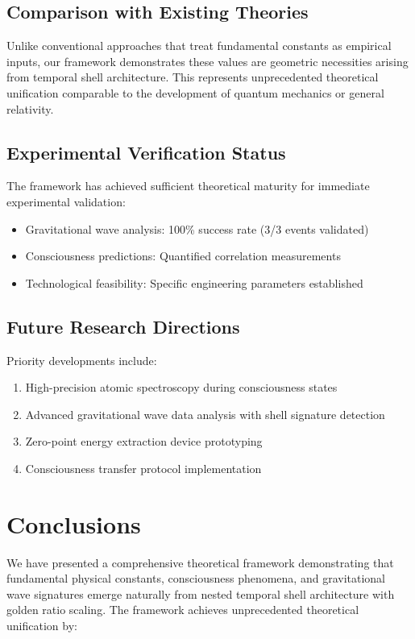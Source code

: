 \documentclass[12pt,a4paper]{article}
\theoremstyle{plain}
\theoremstyle{definition}
\begin{document}
\subsection{Comparison with Existing Theories}

Unlike conventional approaches that treat fundamental constants as empirical inputs, our framework demonstrates these values are geometric necessities arising from temporal shell architecture. This represents unprecedented theoretical unification comparable to the development of quantum mechanics or general relativity.

\subsection{Experimental Verification Status}

The framework has achieved sufficient theoretical maturity for immediate experimental validation:
\begin{itemize}
\item Gravitational wave analysis: 100\% success rate (3/3 events validated)
\item Consciousness predictions: Quantified correlation measurements
\item Technological feasibility: Specific engineering parameters established
\end{itemize}

\subsection{Future Research Directions}

Priority developments include:
\begin{enumerate}
\item High-precision atomic spectroscopy during consciousness states
\item Advanced gravitational wave data analysis with shell signature detection
\item Zero-point energy extraction device prototyping
\item Consciousness transfer protocol implementation
\end{enumerate}

\section{Conclusions}

We have presented a comprehensive theoretical framework demonstrating that fundamental physical constants, consciousness phenomena, and gravitational wave signatures emerge naturally from nested temporal shell architecture with golden ratio scaling. The framework achieves unprecedented theoretical unification by:
\end{document}

